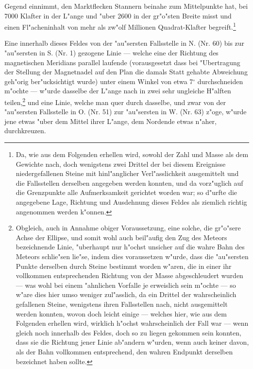 \documentclass[a4paper, 11pt, oneside, german]{article}
\begin{document}
Gegend einnimmt, den Marktflecken Stannern beinahe zum Mittelpunkte hat, bei 7000 Klafter in der L"ange und "uber 2600 in der gr"o"sten Breite misst und einen Fl"acheninhalt von mehr als zw"olf Millionen Quadrat-Klafter begreift.\footnote{Da, wie aus dem Folgenden erhellen wird, sowohl der Zahl und Masse als dem Gewichte nach, doch wenigstens zwei Drittel der bei diesem Ereignisse niedergefallenen Steine mit hinl"anglicher Verl"asslichkeit ausgemittelt und die Fallsstellen derselben angegeben werden konnten, und da vorz"uglich auf die Grenzpunkte alle Aufmerksamkeit gerichtet worden war; so d"urfte die angegebene Lage, Richtung und Ausdehnung dieses Feldes als ziemlich richtig angenommen werden k"onnen.}

Eine innerhalb dieses Feldes von der "au"sersten Fallsstelle in N. (Nr. 60) bis zur "au"sersten in S. (Nr. 1) gezogene Linie --- welche eine der Richtung des magnetischen Meridians parallel laufende (vorausgesetzt dass bei "Ubertragung der Stellung der Magnetnadel auf den Plan die damals Statt gehabte Abweichung geh"orig ber"ucksichtigt wurde) unter einem Winkel von etwa 7$^{\circ}$ durchschneiden m"ochte --- w"urde dasselbe der L"ange nach in zwei sehr ungleiche H"alften teilen,\footnote{Obgleich, auch in Annahme obiger Voraussetzung, eine solche, die gr"o"sere Achse der Ellipse, und somit wohl auch beil"aufig den Zug des Meteors bezeichnende Linie, "uberhaupt nur h"ochst unsicher auf die wahre Bahn des Meteors schlie"sen lie"se, indem dies voraussetzen w"urde, dass die "au"sersten Punkte derselben durch Steine bestimmt worden w"aren, die in einer ihr vollkommen entsprechenden Richtung von der Masse abgeschleudert wurden --- was wohl bei einem "ahnlichen Vorfalle je erweislich sein m"ochte --- so w"are dies hier umso weniger zul"asslich, da ein Drittel der wahrscheinlich gefallenen Steine, wenigstens ihren Fallsstellen nach, nicht ausgemittelt werden konnten, wovon doch leicht einige --- welches hier, wie aus dem Folgenden erhellen wird, wirklich h"ochst wahrscheinlich der Fall war --- wenn gleich noch innerhalb des Feldes, doch so zu liegen gekommen sein konnten, dass sie die Richtung jener Linie ab"andern w"urden, wenn auch keiner davon, als der Bahn vollkommen entsprechend, den wahren Endpunkt derselben bezeichnet haben sollte.} und eine Linie, welche man quer durch dasselbe, und zwar von der "au"sersten Fallsstelle in O. (Nr. 51) zur "au"sersten in W. (Nr. 63) z"oge, w"urde jene etwas "uber dem Mittel ihrer L"ange, dem Nordende etwas n"aher, durchkreuzen.
\end{document}
